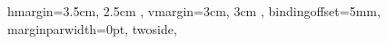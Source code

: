 {{      %
      hmargin={3.5cm, 2.5cm }, vmargin={3cm, 3cm }, %
      bindingoffset=5mm, %
      marginparwidth=0pt, %
      twoside,
   }
} %

